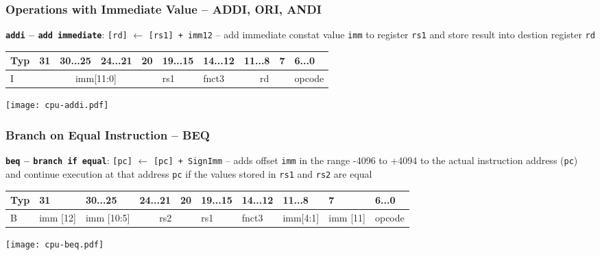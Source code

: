 \documentclass{beamer}
\begin{document}
\begin{frame}[shrink=10]
\frametitle{Operations with Immediate Value -- ADDI, ORI, ANDI}

\textbf{\texttt{addi} -- \texttt{add immediate}}: \texttt{[rd]} $\leftarrow$ \texttt{[rs1] + imm12} -- add immediate constat value \texttt{imm} to register \texttt{rs1} and store result into destion register \texttt{rd}

\bigskip

\begin{table}
\footnotesize
\begin{tabular}{|m{0.4cm}|m{0.4cm}|m{1.0cm}|m{1.0cm}|m{0.4cm}|m{1.0cm}|m{1.0cm}|m{1.0cm}|m{0.4cm}|m{1.0cm}|}\hline
Typ & 31 & 30...25 & 24...21 & 20 & 19...15 & 14...12 & 11...8 & 7 & 6...0 \\ \hline
I & \multicolumn{4}{c|}{ imm[11:0] } & rs1 & fnct3 &\multicolumn{2}{c|}{ rd } & opcode\\ \hline
\end{tabular}
\end{table}

\bigskip

\texttt{[image: cpu-addi.pdf]}

\end{frame}


\begin{frame}[shrink=15]
\frametitle{Branch on Equal Instruction -- BEQ}

\textbf{\texttt{beq} -- \texttt{branch if equal}}: \texttt{[pc]} $\leftarrow$ \texttt{[pc] + SignImm} -- adds offset \texttt{imm} in the range -4096 to +4094 to the actual instruction address (\texttt{pc}) and continue execution at that address \texttt{pc} if the values stored in \texttt{rs1} and \texttt{rs2} are equal

\bigskip

\begin{table}
\footnotesize
\begin{tabular}{|m{0.4cm}|m{0.4cm}|m{1.0cm}|m{1.0cm}|m{0.4cm}|m{1.0cm}|m{1.0cm}|m{1.0cm}|m{0.4cm}|m{1.0cm}|}\hline
Typ & 31 & 30...25 & 24...21 & 20 & 19...15 & 14...12 & 11...8 & 7 & 6...0 \\ \hline
B & imm [12] & imm [10:5]  & \multicolumn{2}{c|}{ rs2 } & rs1 & fnct3 & imm[4:1]& imm [11] & opcode\\ \hline
\end{tabular}
\end{table}

\bigskip

\texttt{[image: cpu-beq.pdf]}

\end{frame}
\end{document}
